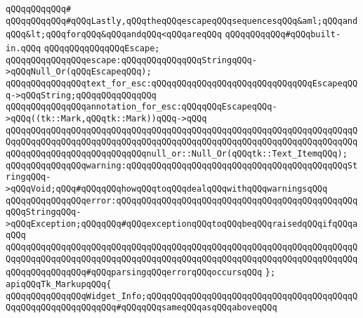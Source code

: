 \verb|qQQqqQQqqQQq#|\newline
\verb|qQQqqQQqqQQq#qQQqLastly,qQQqtheqQQqescapeqQQqsequencesqQQq&aml;qQQqandqQQq&lt;qQQqforqQQq&qQQqandqQQq<qQQqareqQQq|\newline
\verb|qQQqqQQqqQQq#qQQqbuilt-in.qQQq|\newline
\newline
\newline
\verb|qQQqqQQqqQQqqQQqEscape;|\newline
\newline
\verb|qQQqqQQqqQQqqQQqescape:qQQqqQQqqQQqqQQqStringqQQq->qQQqNull_Or(qQQqEscapeqQQq);|\newline
\newline
\verb|qQQqqQQqqQQqqQQqtext_for_esc:qQQqqQQqqQQqqQQqqQQqqQQqqQQqqQQqEscapeqQQq->qQQqString;qQQqqQQqqQQqqQQq|\newline
\newline
\verb|qQQqqQQqqQQqqQQqannotation_for_esc:qQQqqQQqEscapeqQQq->qQQq((tk::Mark,qQQqtk::Mark))qQQq->qQQq|\newline
\verb|qQQqqQQqqQQqqQQqqQQqqQQqqQQqqQQqqQQqqQQqqQQqqQQqqQQqqQQqqQQqqQQqqQQqqQQqqQQqqQQqqQQqqQQqqQQqqQQqqQQqqQQqqQQqqQQqqQQqqQQqqQQqqQQqqQQqqQQqqQQqqQQqqQQqqQQqqQQqqQQqqQQqqQQqnull_or::Null_Or(qQQqtk::Text_ItemqQQq);|\newline
\newline
\newline
\verb|qQQqqQQqqQQqqQQqwarning:qQQqqQQqqQQqqQQqqQQqqQQqqQQqqQQqqQQqqQQqqQQqStringqQQq->qQQqVoid;qQQq#qQQqqQQqhowqQQqtoqQQqdealqQQqwithqQQqwarningsqQQq|\newline
\newline
\verb|qQQqqQQqqQQqqQQqerror:qQQqqQQqqQQqqQQqqQQqqQQqqQQqqQQqqQQqqQQqqQQqqQQqqQQqStringqQQq->qQQqException;qQQqqQQq#qQQqexceptionqQQqtoqQQqbeqQQqraisedqQQqifqQQqaqQQq|\newline
\verb|qQQqqQQqqQQqqQQqqQQqqQQqqQQqqQQqqQQqqQQqqQQqqQQqqQQqqQQqqQQqqQQqqQQqqQQqqQQqqQQqqQQqqQQqqQQqqQQqqQQqqQQqqQQqqQQqqQQqqQQqqQQqqQQqqQQqqQQqqQQqqQQqqQQqqQQqqQQq#qQQqparsingqQQqerrorqQQqoccursqQQq|\newline
\newline
\verb|};|\newline
\newline
\verb|apiqQQqTk_MarkupqQQq{|\newline
\newline
\newline
\verb|qQQqqQQqqQQqqQQqWidget_Info;qQQqqQQqqQQqqQQqqQQqqQQqqQQqqQQqqQQqqQQqqQQqqQQqqQQqqQQqqQQqqQQq#qQQqqQQqsameqQQqasqQQqaboveqQQq|\newline
